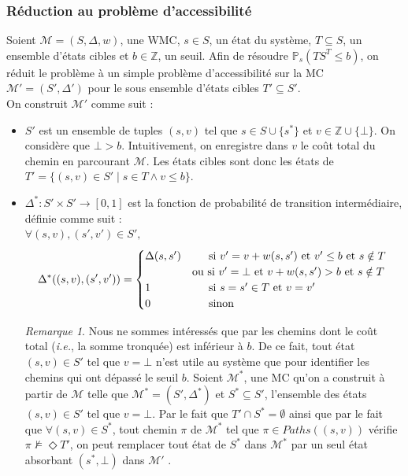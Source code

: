 \documentclass[12pt,a4paper]{report}
\theoremstyle{definition}%
\theoremstyle{remark}
\newtheorem{remark}{Remarque}[chapter]
\newcommand{\ie}{\textit{i.e.}, }
\newcommand{\pr}{\mathbb{P}}
\let\labelitemi\labelitemii
\begin{document}
\subsubsection*{Réduction au problème d'accessibilité}
Soient $\mathcal{M} = (S, \Delta, w)$, une WMC, $s \in S$, un état du système, $T \subseteq S$, un ensemble d'états cibles et $b \in \mathbb{Z}$, un seuil. Afin de résoudre $\pr_s(TS^T \leq b)$, on réduit le problème à un simple problème d'accessibilité sur la MC $\mathcal{M}' = (S', \Delta')$ pour le sous ensemble d'états cibles $T' \subseteq S'$. \\On construit $\mathcal{M'}$ comme suit :
\begin{itemize}
	\renewcommand{\labelitemi}{\tiny$\bullet$}
	\item $S'$ est un ensemble de tuples $(s, v)$ tel que $s \in S \cup \{s^*\}$ et $v \in \mathbb{Z} \cup \{ \bot \}$. On considère que $\bot > b$. Intuitivement, on enregistre dans $v$ le coût total du chemin en parcourant $\mathcal{M}$. Les états cibles sont donc les états de $T' = \{ (s, v) \in S' \; | \; s \in T \wedge v \leq b \}$.
	\item $\Delta^*: S' \times S' \rightarrow [0,1]$ est la fonction de probabilité de transition intermédiaire, définie comme suit :\\
	$\forall (s, v), (s', v') \in S',$
	\[
		\Delta^*((s, v), (s', v')) = 
		\begin{cases}
		\Delta(s, s') & \text{\quad \, si $v' = v + w(s, s')$ et $v' \leq b$  et $s \notin T$ } \\
		 & \text{ou si $v' = \bot$ et $v + w(s, s') > b$  et $s \notin T$} \\
		 1 & \quad \, \text{ si $s = s' \in T$ et $v = v'$} \\
		 0 & \quad \, \text{ sinon}
		\end{cases}
	\]

\begin{remark}
	Nous ne sommes intéressés que par les chemins dont le coût total (\ie la somme tronquée) est inférieur à $b$. De ce fait, tout état $(s, v) \in S'$ tel que $v = \bot$ n'est utile au système que pour identifier les chemins qui ont dépassé le seuil $b$. Soient $\mathcal{M^*}$, une MC qu'on a construit à partir de $\mathcal{M}$ telle que $\mathcal{M^*} = (S', \Delta^*)$ et $S^* \subseteq S'$, l'ensemble des états $(s, v) \in S'$ tel que $v = \bot$. Par le fait que $T' \cap S^* = \emptyset$ ainsi que par le fait que $\forall (s, v) \in S^*$, tout chemin $\pi$ de $\mathcal{M^*}$ tel que $\pi \in Paths((s, v))$ vérifie $\pi \not \models \Diamond T'$, on peut remplacer tout état de $S^*$ dans $\mathcal{M^*}$ par un seul état absorbant $(s^*, \bot)$ dans $\mathcal{M'}$ . \\
\end{remark}


\end{itemize}
\end{document}

